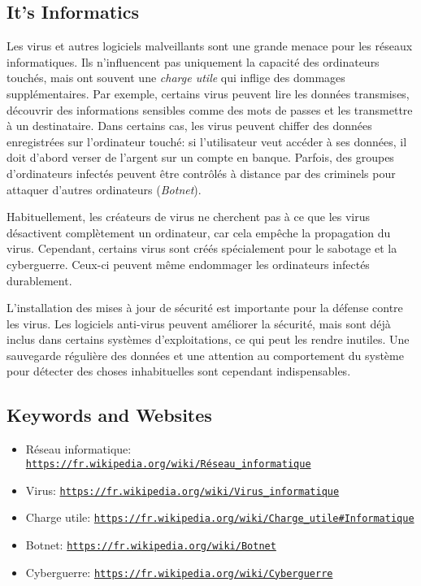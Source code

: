 \documentclass[a4paper,11pt]{report}
\newcommand{\BrochureUrlText}[1]{\texttt{#1}}
\begin{document}
\subsection*{It’s Informatics}

Les virus et autres logiciels malveillants sont une grande menace pour les réseaux informatiques. Ils n’influencent pas uniquement la capacité des ordinateurs touchés, mais ont souvent une \emph{charge utile} qui inflige des dommages supplémentaires. Par exemple, certains virus peuvent lire les données transmises, découvrir des informations sensibles comme des mots de passes et les transmettre à un destinataire. Dans certains cas, les virus peuvent chiffer des données enregistrées sur l’ordinateur touché: si l’utilisateur veut accéder à ses données, il doit d’abord verser de l’argent sur un compte en banque. Parfois, des groupes d’ordinateurs infectés peuvent être contrôlés à distance par des criminels pour attaquer d’autres ordinateurs (\emph{Botnet}).

Habituellement, les créateurs de virus ne cherchent pas à ce que les virus désactivent complètement un ordinateur, car cela empêche la propagation du virus. Cependant, certains virus sont créés spécialement pour le sabotage et la cyberguerre. Ceux-ci peuvent même endommager les ordinateurs infectés durablement.

L’installation des mises à jour de sécurité est importante pour la défense contre les virus. Les logiciels anti-virus peuvent améliorer la sécurité, mais sont déjà inclus dans certains systèmes d’exploitations, ce qui peut les rendre inutiles. Une sauvegarde régulière des données et une attention au comportement du système pour détecter des choses inhabituelles sont cependant indispensables.

{\raggedright

\subsection*{Keywords and Websites}

\begin{itemize}
  \item Réseau informatique: \href{https://fr.wikipedia.org/wiki/R\%C3\%A9seau_informatique}{\BrochureUrlText{https://fr.wikipedia.org/wiki/Réseau\_informatique}}
  \item Virus: \href{https://fr.wikipedia.org/wiki/Virus_informatique}{\BrochureUrlText{https://fr.wikipedia.org/wiki/Virus\_informatique}}
  \item Charge utile: \href{https://fr.wikipedia.org/wiki/Charge_utile\#Informatique}{\BrochureUrlText{https://fr.wikipedia.org/wiki/Charge\_utile\#Informatique}}
  \item Botnet: \href{https://fr.wikipedia.org/wiki/Botnet}{\BrochureUrlText{https://fr.wikipedia.org/wiki/Botnet}}
  \item Cyberguerre: \href{https://fr.wikipedia.org/wiki/Cyberguerre}{\BrochureUrlText{https://fr.wikipedia.org/wiki/Cyberguerre}}
\end{itemize}


}
\end{document}
